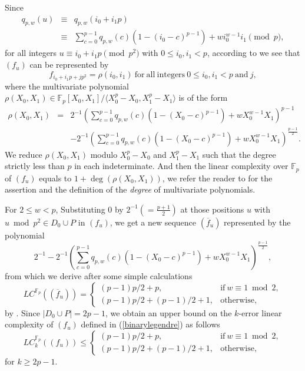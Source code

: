 \documentclass [11pt,a4paper]{article}
\def\F{\mathbb{F}}
\begin{document}
Since
\begin{eqnarray*}
 q_{p,w}(u) & \equiv & q_{p,w}(i_0+i_1p)\\
            & \equiv & \sum\limits_{c=0}^{p-1}q_{p,w}(c)\left(1-(i_0-c)^{p-1} \right)+wi_0^{w-1}i_1 \pmod p,
\end{eqnarray*}
for all integers $u\equiv i_0+i_1p \pmod {p^2}$ with $0\le i_0, i_1<p$, according to \cite{AW06} we see that
$(f_u)$ can be represented by
$$
f_{i_0+i_1p+jp^2}=\rho(i_0,i_1) ~\mathrm{for~ all~ integers}~ 0\le i_0, i_1<p ~\mathrm{and}~ j,
$$
where the multivariate polynomial $\rho(X_0,X_1)\in \F_p[X_0,X_1]/\langle X^p_0-X_0, X^p_1-X_1\rangle$ is of the form
\begin{eqnarray*}
\rho(X_0,X_1) & = & 2^{-1}\left(\sum\limits_{c=0}^{p-1}q_{p,w}(c)\left(1-(X_0-c)^{p-1} \right)+wX_0^{w-1}X_1 \right)^{p-1}\\
&& -2^{-1}\left(\sum\limits_{c=0}^{p-1}q_{p,w}(c)\left(1-(X_0-c)^{p-1} \right)+wX_0^{w-1}X_1 \right)^{\frac{p-1}{2}}.
\end{eqnarray*}
We reduce $\rho(X_0,X_1)$ modulo $X^p_0-X_0$ and $X^p_1-X_1$ such that the degree strictly less than $p$ in each indeterminate.
And then the linear complexity over $\F_p$ of $(f_u)$ equals to $1+\deg(\rho(X_0,X_1))$, we refer the reader to \cite[Theorem 8]{BEP} for the assertion and the definition of the \emph{degree} of multivariate polynomials.



For $2\le w<p$, Substituting $0$ by $2^{-1}(=\frac{p+1}{2})$ at those positions $u$ with $u\bmod {p^2}\in D_0\cup P$ in $(f_u)$,
we get a new sequence $(\overline{f}_u)$ represented by the polynomial
$$
2^{-1}-2^{-1}\left(\sum\limits_{c=0}^{p-1}q_{p,w}(c)\left(1-(X_0-c)^{p-1} \right)+wX_0^{w-1}X_1 \right)^{\frac{p-1}{2}},
$$
from which we derive after some simple calculations
$$
LC^{\F_p}((\overline{f}_u))= \left\{
\begin{array}{ll}
(p-1)p/2+p, & \mathrm{if}~ w\equiv 1 \bmod 2,\\
(p-1)p/2+(p-1)/2+1, & \mathrm{otherwise},
\end{array}
\right.
$$
by \cite[Theorem 8]{BEP}. Since $|D_0\cup P|=2p-1$, we obtain an upper bound on the $k$-error linear complexity
of  $(f_u)$ defined in (\ref{binarylegendre}) as follows
$$
LC^{\F_p}_{k}((f_u))\le \left\{
\begin{array}{ll}
(p-1)p/2+p, & \mathrm{if}~ w\equiv 1 \bmod 2,\\
(p-1)p/2+(p-1)/2+1, & \mathrm{otherwise},
\end{array}
\right.
$$
for $k\ge 2p-1$.
\end{document}
